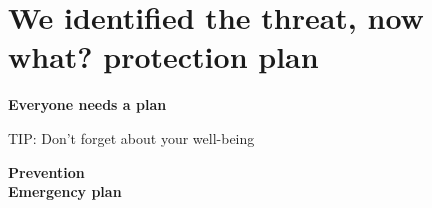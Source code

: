 \documentclass[11pt]{beamer}
\begin{document}
\section{We identified the threat, now what? protection plan}
\begin{frame}
\begin{center}
\textbf{Everyone needs a plan}
\end{center}
\end{frame}
\begin{frame}
TIP: Don't forget about your well-being
\end{frame}
\begin{frame}
\begin{center}
\textbf{Prevention}\\
\textbf{Emergency plan}
\end{center}
\end{frame}
\end{document}
